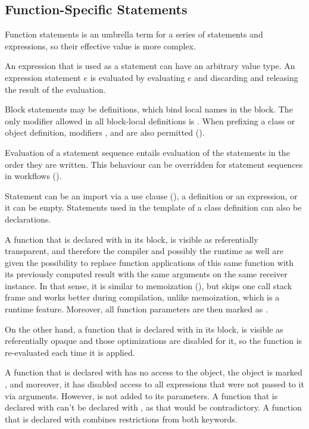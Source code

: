 \subsection{Function-Specific Statements}

Function statements is an umbrella term for a series of statements and expressions, so their effective value is more complex. 

An expression that is used as a statement can have an arbitrary value type. An expression statement $e$ is evaluated by evaluating $e$ and discarding and releasing the result of the evaluation. 

Block statements may be definitions, which bind local names in the block. The only modifier allowed in all block-local definitions is . When prefixing a class or object definition, modifiers ,  and  are also permitted ().

Evaluation of a statement sequence entails evaluation of the statements in the order they are written. This behaviour can be overridden for statement sequences in workflows ().

Statement can be an import via a use clause (), a definition or an expression, or it can be empty. Statements used in the template of a class definition can also be declarations. 

A function that is declared with  in its  block, is visible as referentially transparent, and therefore the compiler and possibly the runtime as well are given the possibility to replace function applications of this same function with its previously computed result with the same arguments on the same receiver instance. In that sense, it is similar to memoization (), but skips one call stack frame and works better during compilation, unlike memoization, which is a runtime feature. Moreover, all function parameters are then marked as . 

On the other hand, a function that is declared with  in its  block, is visible as referentially opaque and those optimizations are disabled for it, so the function is re-evaluated each time it is applied. 

A function that is declared with  has no access to the  object, the  object is marked , and moreover, it has disabled access to all expressions that were not passed to it via arguments. However,  is not added to its parameters. A function that is declared with  can't be declared with , as that would be contradictory. A function that is declared with  combines restrictions from both keywords. 

